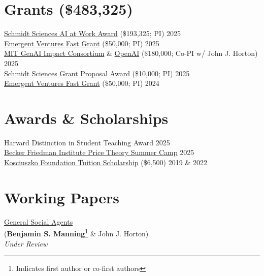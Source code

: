 \documentclass[margin,line,pifont,palatino,courier, 9pt]{res}
\begin{document}
\begin{resume}
\section{\sc Grants (\$483,325)}
\href{https://www.schmidtsciences.org/ai-at-work/}{Schmidt Sciences AI at Work Award} (\$193,325; PI) \hfill 2025 \\
\href{https://www.mercatus.org/emergent-ventures}{Emergent Ventures Fast Grant} (\$50,000; PI) \hfill 2025 \\
\href{https://computing.mit.edu/research/mit-generative-ai-impact-consortium/}{MIT GenAI Impact Consortium} \& \href{https://openai.com/}{OpenAI} (\$180,000; Co-PI w/ John J. Horton) \hfill 2025 \\
\href{https://www.schmidtsciences.org/ai-at-work/}{Schmidt Sciences Grant Proposal Award} (\$10,000; PI) \hfill 2025 \\
\href{https://www.mercatus.org/emergent-ventures}{Emergent Ventures Fast Grant} (\$50,000; PI) \hfill 2024 

\section{\sc Awards \& Scholarships}
Harvard Distinction in Student Teaching Award \hfill 2025 \\
\href{https://bfi.uchicago.edu/events/event/2025-price-theory-summer-camp/}{Becker Friedman Institute Price Theory Summer Camp} \hfill 2025 \\
\href{https://thekf.org/scholarship/tuition-scholarships/tuition-scholarships-for-graduate-studies/}{Kosciuszko Foundation Tuition Scholarship} (\$6,500) \hfill 2019 \& 2022 




\section{\sc Working Papers}

\href{https://benjaminmanning.io/files/optimize.pdf}{General Social Agents}\\
(\textbf{Benjamin S. Manning}\footnote{Indicates first author or co-first authors} \& John J. Horton)\\
\textit{Under Review}


\end{resume}
\end{document}
